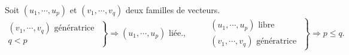 \begin{exple}
  Soit $(u_1,\cdots,u_p)$ et $(v_1,\cdots,v_q)$ deux familles de vecteurs.
\begin{displaymath}
\left. 
\begin{aligned}
  (v_1,\cdots,v_q)\text{ génératrice } \\ q < p
\end{aligned}
\right\rbrace \Rightarrow (u_1,\cdots,u_p)\text{ liée.}, \hspace{1cm}
\left. 
\begin{aligned}
  (u_1,\cdots,u_p)\text{ libre } \\ (v_1,\cdots,v_q)\text{ génératrice }
\end{aligned}
\right\rbrace \Rightarrow p \leq q.
\end{displaymath}
\end{exple}



